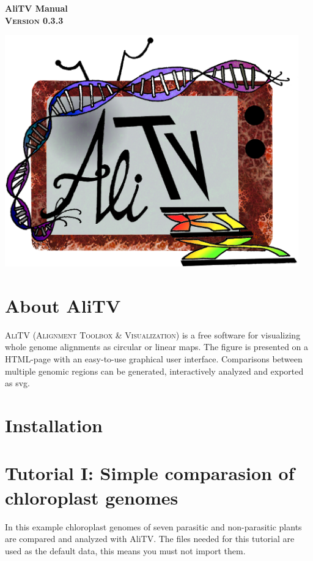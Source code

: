 \documentclass[a4paper]{scrartcl}
\begin{document}
\begin{titlepage}
    \begin{center}
    \huge \textbf{\textsf{AliTV Manual}} \\
    \vspace{0.5cm}
    \LARGE\textbf{\textsc{Version 0.3.3}}\\
    \vspace{1cm}
		\begin{center}
			\includegraphics[height=10cm]{ali_logo2.png}
		\end{center}
    \end{center}
\end{titlepage}

\thispagestyle{empty}

\newpage
\section*{About AliTV}
\textsc{AliTV} (\textsc{Alignment Toolbox \& Visualization}) is a free software for visualizing whole genome alignments as circular or linear maps. The figure is presented on a HTML-page with an easy-to-use graphical user interface. Comparisons between multiple genomic regions can be generated, interactively analyzed and exported as svg. 

\section*{Installation}
\newpage
\section*{Tutorial I: Simple comparasion of chloroplast genomes}
In this example chloroplast genomes of seven parasitic and non-parasitic plants are compared and analyzed with AliTV. The files needed for this tutorial are used as the default data, this means you must not import them.
\end{document}
